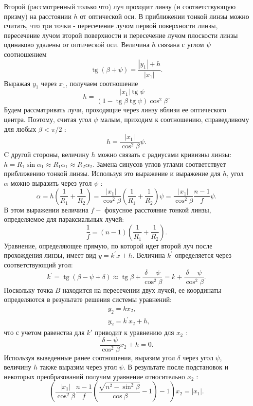 \documentclass[a4paper,12pt]{article} %
\begin{document}
Второй (рассмотренный только что) луч проходит линзу (и соответствующую призму) на расстоянии $h$ от оптической оси. В приближении тонкой линзы можно считать, что три точки - пересечение лучом первой поверхности линзы, пересечение лучом второй поверхности и пересечение лучом плоскости линзы одинаково удалены от оптической оси. Величина $h$ связана с углом $\psi$ соотношением
$$
\operatorname{tg}(\beta+\psi)=\frac{\left|y_{1}\right|+h}{\left|x_{1}\right|} .
$$
Выражая $y_{1}$ через $x_{1}$, получаем соотношение
$$
h=\frac{\left|x_{1}\right| \operatorname{tg} \psi}{(1-\operatorname{tg} \beta \operatorname{tg} \psi) \cos ^{2} \beta} .
$$
Будем рассматривать лучи, проходящие через линзу вблизи ее оптического центра. Поэтому, считая угол $\psi$ малым, приходим к соотношению, справедливому для любых $\beta<\pi / 2$ :
$$
h=\frac{\left|x_{1}\right|}{\cos ^{2} \beta} \psi .
$$
C другой стороны, величину $h$ можно связать с радиусами кривизны линзы: $h=R_{1} \sin \alpha_{1} \approx R_{1} \alpha_{1} \approx R_{2} \alpha_{2}$. Замена синусов углов углами соответствует приближению тонкой линзы. Используя это выражение и выражение для $h$, угол $\alpha$ можно выразить через угол $\psi$ :
$$
\alpha=h\left(\frac{1}{R_{1}}+\frac{1}{R_{2}}\right)=\frac{\left|x_{1}\right|}{\cos ^{2} \beta}\left(\frac{1}{R_{1}}+\frac{1}{R_{2}}\right) \psi=\frac{\left|x_{1}\right|}{\cos ^{2} \beta} \frac{n-1}{f} \psi .
$$
В этом выражении величина $f-$ фокусное расстояние тонкой линзы, определяемое для параксиальных лучей:
$$
\frac{1}{f}=(n-1)\left(\frac{1}{R_{1}}+\frac{1}{R_{2}}\right) .
$$
Уравнение, определяющее прямую, по которой идет второй луч после прохождения линзы, имеет вид $y=k^{\prime} x+h$. Величина $k^{\prime}$ определяется через соответствующий угол:
$$
k^{\prime}=\operatorname{tg}(\beta-\psi+\delta) \approx \operatorname{tg} \beta+\frac{\delta-\psi}{\cos ^{2} \beta}=k+\frac{\delta-\psi}{\cos ^{2} \beta} .
$$
Поскольку точка $B$ находится на пересечении двух лучей, ее координаты определяются в результате решения системы уравнений:
$$
\begin{aligned}
&y_{2}=k x_{2}, \\
&y_{2}=k^{\prime} x_{2}+h,
\end{aligned}
$$
что с учетом равенства для $k'$ приводит к уравнению для $x_{2}$ :
$$
\frac{\delta-\psi}{\cos ^{2} \beta} x_{2}+h=0 .
$$
Используя выведенные ранее соотношения, выразим угол $\delta$ через угол $\psi$, величину $h$ также выразим через угол $\psi$. В результате после подстановок и некоторых преобразований получим уравнение относительно $x_{2}$ :
$$
\left(\frac{\left|x_{1}\right|}{\cos ^{2} \beta} \frac{n-1}{f}\left(\frac{\sqrt{n^{2}-\sin ^{2} \beta}}{\cos \beta}-1\right)-1\right) x_{2}=\left|x_{1}\right| .
$$
\end{document}
